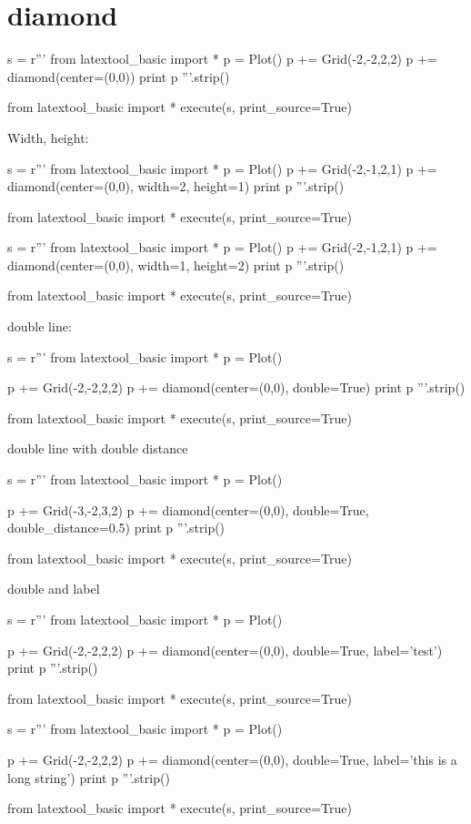 \section{diamond}

\begin{python}
s = r'''
from latextool_basic import *
p = Plot()
p += Grid(-2,-2,2,2)
p += diamond(center=(0,0))
print p
'''.strip()

from latextool_basic import *
execute(s, print_source=True)
\end{python}


\newpage
Width, height:
\begin{python}
s = r'''
from latextool_basic import *
p = Plot()
p += Grid(-2,-1,2,1)
p += diamond(center=(0,0), width=2, height=1)
print p
'''.strip()

from latextool_basic import *
execute(s, print_source=True)
\end{python}

\begin{python}
s = r'''
from latextool_basic import *
p = Plot()
p += Grid(-2,-1,2,1)
p += diamond(center=(0,0), width=1, height=2)
print p
'''.strip()

from latextool_basic import *
execute(s, print_source=True)
\end{python}


\newpage
double line:
\begin{python}
s = r'''
from latextool_basic import *
p = Plot()

p += Grid(-2,-2,2,2)
p += diamond(center=(0,0), double=True)
print p
'''.strip()

from latextool_basic import *
execute(s, print_source=True)
\end{python}


double line with double distance
\begin{python}
s = r'''
from latextool_basic import *
p = Plot()

p += Grid(-3,-2,3,2)
p += diamond(center=(0,0), double=True, double_distance=0.5)
print p
'''.strip()

from latextool_basic import *
execute(s, print_source=True)
\end{python}


\newpage
double and label
\begin{python}
s = r'''
from latextool_basic import *
p = Plot()

p += Grid(-2,-2,2,2)
p += diamond(center=(0,0), double=True, label='test')
print p
'''.strip()

from latextool_basic import *
execute(s, print_source=True)
\end{python}

\begin{python}
s = r'''
from latextool_basic import *
p = Plot()

p += Grid(-2,-2,2,2)
p += diamond(center=(0,0), double=True, label='this is a long string')
print p
'''.strip()

from latextool_basic import *
execute(s, print_source=True)
\end{python}
